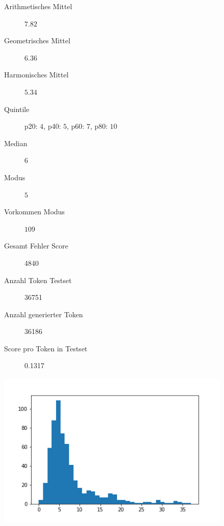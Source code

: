 \documentclass[pdftex,a4paper,halfparskip, article]{scrartcl}
\begin{document}
\begin{figure}
\centering
\begin{minipage}{.5\textwidth}
  \centering
  \begin{description}
	\item[Arithmetisches Mittel] $7.82$	
	\item[Geometrisches Mittel] $6.36$
	\item[Harmonisches Mittel] $5.34$
	\item[Quintile] p20: $4$, p40: $5$, p60: $7$, p80: $10$
	\item[Median] $6$
	\item[Modus] $5$
	\item[Vorkommen Modus] $109$
	\item[Gesamt Fehler Score] 4840
	\item[Anzahl Token Testset] 36751 
	\item[Anzahl generierter Token] 36186
	\item[Score pro Token in Testset] 0.1317
\end{description}
  \label{fig:lage_bin10}
\end{minipage}%
\begin{minipage}{.5\textwidth}
  \centering
  \includegraphics[width=1\linewidth]{predictions_bin10_histogramm}
  \label{fig:hist_bin10}
\end{minipage}
\end{figure}
\end{document}
